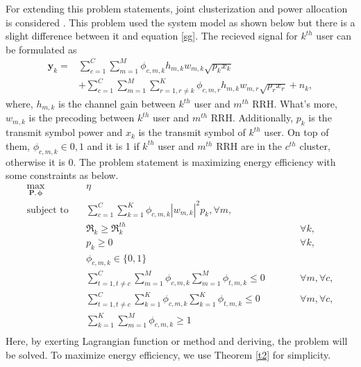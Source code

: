 \documentclass[journal,onecolumn,11pt,draftcls,doublespace]{IEEEtran}
\begin{document}
For extending this problem statements, joint clusterization and power allocation is considered \cite{55}. This problem used the system model as shown below but there is a slight difference between it and equation \eqref{sg}.
The recieved signal for $k^{th}$ user can be formulated as 
\begin{equation} \label{sg1}
\begin{aligned}
\textbf{y}_{k} =& \sum_{c=1}^C \sum_{m=1}^M  \phi_{c,m,k}h_{m,k}w_{m,k} \sqrt{p_k x_k} \\
&+ \sum_{c=1}^C \sum_{m=1}^M \sum_{r=1 ,r \neq k}^K  \phi_{c,m,r}h_{m,k}w_{m,r} \sqrt{p_r x_r} + n_k,
\end{aligned}	
\end{equation}
where,  $h_{m,k}$ is the channel gain between $k^{th}$ user and $m^{th}$ RRH. What's more, $w_{m,k}$ is the precoding between $k^{th}$ user and $m^{th}$ RRH. Additionally, $p_k$ is the 
transmit symbol power and $x_k$ is the transmit symbol of $k^{th}$ user. On top of them, $ \phi_{c,m,k} \in {0,1}$ and it is 1 if $k^{th}$ user and $m^{th}$ RRH are in the $c^{th}$ cluster, otherwise it is 0.  The problem statement  is maximizing energy efficiency with some constraints as below.
\begin{equation}
\begin{aligned}
\max\limits_{\boldsymbol{P},\boldsymbol{\phi}}   \quad &   \eta\\
\text{subject to} \quad  & \sum_{c=1}^C \sum_{k=1}^K  \phi_{c,m,k}|w_{m,k}|^2 p_k , \forall m,   \\
&\mathfrak{R}_{k} \geq  \mathfrak{R}_{k}^{th} && \qquad  \forall k, \\
&p_{k}  \geq 0                                  &&\qquad  \forall k, \\
& \phi_{c,m,k} \in \{0,1\} \\
 &\sum_{t=1, t \neq c}^C \sum_{m=1}^M  \phi_{c,m,k}\sum_{m=1}^M \phi_{t,m,k} \leq 0    &&\qquad    \forall m  , \forall c, \\
  &\sum_{t=1, t \neq c}^C \sum_{k=1}^K  \phi_{c,m,k}\sum_{k=1}^K \phi_{t,m,k} \leq 0      &&\qquad      \forall m  , \forall c,\\
  &\sum_{k=1}^K \sum_{m=1}^M  \phi_{c,m,k} \geq 1\\
\end{aligned}	
\end{equation}
Here, by exerting Lagrangian function or method and deriving, the problem will be solved. To maximize energy efficiency, we use Theorem \ref{t2} for simplicity. 
\end{document}
